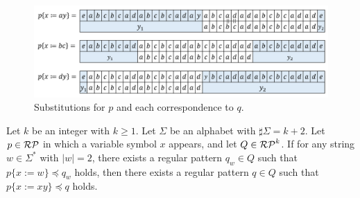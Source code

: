 \begin{figure}[t]
\includegraphics[width=\linewidth]{figs/Exam_b=a_c=d.png}
\caption{Substitutions for $p$ and each correspondence to $q$.}
\label{b=aとc=dの例}
\end{figure}

\begin{lem}\label{追加補題1}
Let $k$ be an integer with $k\geq 1$.
Let $\Sigma$ be an alphabet with $\sharp \Sigma = k + 2$.
Let $p \in \mathcal{RP}$ in which a variable symbol $x$ appears, and let $Q \in \mathcal{RP}^{k}$.
If for any string $w \in \Sigma^{\ast}$ with $|w|=2$, there exists a regular pattern $q_{w} \in Q$ such that $p \{ x:=w \} \preceq q_{w}$ holds, then there exists a regular pattern $q \in Q$ such that $p \{ x:=xy \} \preceq q$ holds.
\end{lem}


